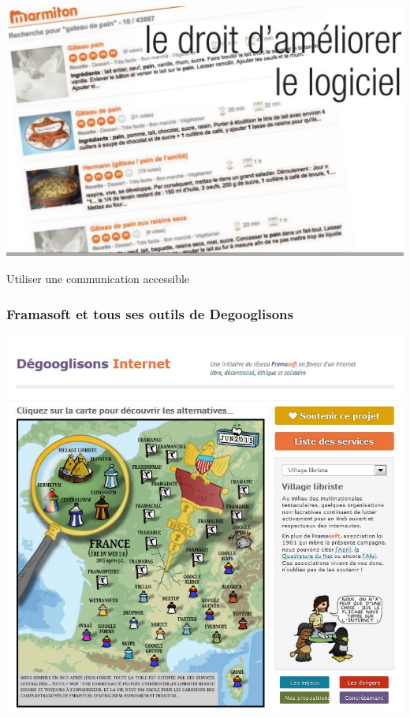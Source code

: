 \documentclass{beamer}
\begin{document}
\begin{frame}
\includegraphics[scale=0.48] {./images/Cuisine04.jpg} 
\end{frame}

\begin{frame}
\begin{center}
\Huge{Utiliser une communication accessible}
\end{center}
\end{frame}

\begin{frame}
\begin{center}
\frametitle{Framasoft et tous ses outils de Degooglisons}
\includegraphics[scale=0.6] {./images/framasoft_degogglisons.jpg}
\end{center}
\end{frame}
\end{document}
